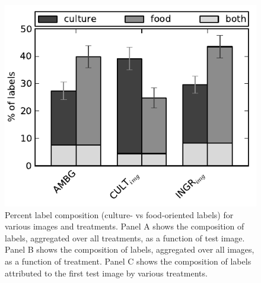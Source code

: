 \documentclass[a4paper]{report}
\begin{document}
\begin{figure}
	\includegraphics{figs/orientationVsTreatment.pdf}
	\caption{Percent label composition (culture- vs food-oriented labels) for 
		various images and treatments.  Panel A shows the composition of 
		labels, aggregated over all treatments, as a function of test image.
		Panel B shows the composition of labels, aggregated over all images, as
		a function of treatment.  Panel C shows the composition of labels 
		attributed to the first test image by various treatments.}
\end{figure}
\end{document}
